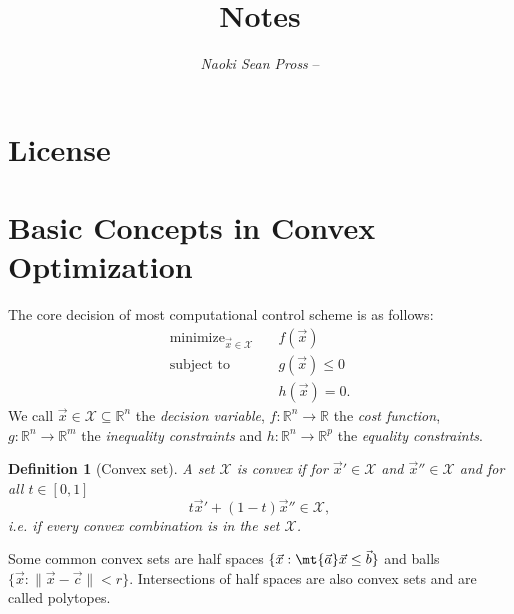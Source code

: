 \documentclass[margin=small]{hsrzf}
\author{\textsl{Naoki Sean Pross} -- \texttt{\theauthoremail}}
\title{\themodule{} Notes}
\date{\thesemester}
\DeclareMathOperator{\minimize}{\text{minimize }}
\newcommand{\reals}{\ensuremath{\mathbb{R}}}
\newtheorem{defn}{Definition}
\begin{document}

\maketitle



\tableofcontents

\section*{License}
\doclicenseThis

\clearpage
\setcounter{page}{1}

\twocolumn

\section{Basic Concepts in Convex Optimization}

The core decision of most computational control scheme is as follows:
\begin{align*}
  \minimize_{\vec{x} \in\mathcal{X}} &\quad f(\vec{x})  \\
  \text{subject to} &\quad g(\vec{x}) \leq 0 \\ &\quad h(\vec{x}) = 0.
\end{align*}
We call $\vec{x}\in\mathcal{X} \subseteq \reals^n$ the \emph{decision
variable}, $f : \reals^n \to \reals$ the \emph{cost function}, $g: \reals^n
\to \reals^m$ the \emph{inequality constraints} and $h: \reals^n \to \reals^p$
the \emph{equality constraints}.

\begin{defn}[Convex set]
  A set $\mathcal{X}$ is convex if for $\vec{x}' \in \mathcal{X}$ and
  $\vec{x}'' \in \mathcal{X}$ and for all $t \in [0,1]$
  \[
    t\vec{x}' + (1-t)\vec{x}'' \in \mathcal{X},
  \]
  i.e. if every convex combination is in the set $\mathcal{X}$.
\end{defn}
Some common convex sets are half spaces $\{\vec{x} : \mt{\vec{a}} \vec{x} \leq
\vec{b}\}$ and balls $\{\vec{x}: \|\vec{x} - \vec{c}\| < r\}$. Intersections of
half spaces are also convex sets and are called polytopes.
\end{document}
